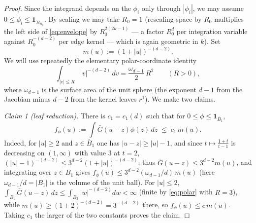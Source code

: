 \documentclass[11pt]{article}
\theoremstyle{definition}
\theoremstyle{remark}
\numberwithin{equation}{section}
\theoremstyle{plain}
\theoremstyle{definition}
\theoremstyle{remark}
\theoremstyle{plain}
\begin{document}
\begin{proof}
Since the integrand depends on the $\phi_i$ only through $|\phi_i|$, we may assume $0\le\phi_i\le\mathbf 1_{\overline B_{R_0}}$. By scaling we may take $R_0=1$ (rescaling space by
$R_0$ multiplies the left side of \eqref{eq:envelope} by $R_0^{2(2k-1)}$ ---
a factor $R_0^{d}$ per integration variable against $R_0^{-(d-2)}$ per edge
kernel --- which is again geometric in $k$). Set
\[
m(u):=(1+|u|)^{-(d-2)} .
\]
We will use repeatedly the elementary polar-coordinate identity
\begin{equation}\label{eq:polar}
\int_{|v|\le R}|v|^{-(d-2)}\,dv=\frac{\omega_{d-1}}{2}\,R^2
\qquad(R>0),
\end{equation}
where $\omega_{d-1}$ is the surface area of the unit sphere (the exponent
$d-1$ from the Jacobian minus $d-2$ from the kernel leaves $r^1$).
We make two claims.

\emph{Claim 1 (leaf reduction).} There is $c_1=c_1(d)$ such that for
$0\le\phi\le\mathbf 1_{\overline B_1}$,
\[
f_\phi(u):=\int\bar G(u-z)\phi(z)\,dz\;\le\;c_1\,m(u).
\]
Indeed, for $|u|\ge2$ and $z\in\overline B_1$ one has $|u-z|\ge|u|-1$, and
since $t\mapsto\frac{1+t}{t-1}$ is decreasing on $(1,\infty)$ with value $3$
at $t=2$, $(|u|-1)^{-(d-2)}\le 3^{d-2}(1+|u|)^{-(d-2)}$; thus
$\bar G(u-z)\le 3^{d-2}m(u)$, and integrating over $z\in\overline B_1$
gives $f_\phi(u)\le 3^{d-2}(\omega_{d-1}/d)\,m(u)$ (here $\omega_{d-1}/d=|B_1|$ is the volume of the unit ball). For $|u|\le2$,
$\int_{B_1}\bar G(u-z)\,dz\le\int_{B_3}|w|^{-(d-2)}dw<\infty$ (finite
by \eqref{eq:polar} with $R=3$), while $m(u)\ge(1+2)^{-(d-2)}=3^{-(d-2)}$
there, so $f_\phi(u)\le c\,m(u)$. Taking $c_1$ the larger of the two constants
proves the claim.


\end{proof}
\end{document}
